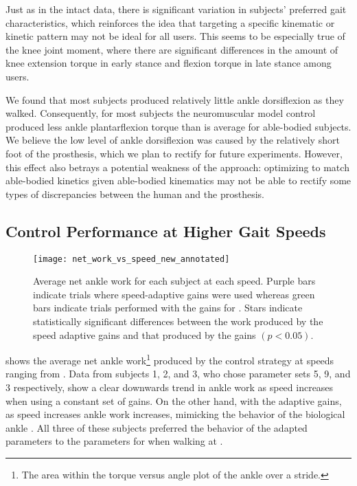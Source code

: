 Just as in the intact data, there is significant variation in subjects'
preferred gait characteristics, which reinforces the idea that targeting a
specific kinematic or kinetic pattern may not be ideal for all users. This seems
to be especially true of the knee joint moment, where there are significant
differences in the amount of knee extension torque in early stance and flexion
torque in late stance among users. 

We found that most subjects produced relatively little ankle dorsiflexion as
they walked. Consequently, for most subjects the neuromuscular model control
produced less ankle plantarflexion torque than is average for able-bodied
subjects.  We believe the low level of ankle dorsiflexion was caused by the
relatively short foot of the prosthesis, which we plan to rectify for future
experiments. However, this effect also betrays a potential weakness of the
approach: optimizing to match able-bodied kinetics given able-bodied kinematics
may not be able to rectify some types of discrepancies between the human and
the prosthesis.

\subsection{Control Performance at Higher Gait Speeds}
\begin{figure}
    \centering
    \texttt{[image: net\_work\_vs\_speed\_new\_annotated]}
    \caption{Average net ankle work for each subject at each speed. Purple bars
    indicate trials where speed-adaptive gains were used whereas green bars
    indicate trials performed with the gains for . Stars
    indicate statistically significant differences between the work produced by
    the speed adaptive gains and that produced by the  gains
    $(p < 0.05)$.}\label{fig:net_work_vs_speed}
\end{figure}

 shows the average net ankle work\footnote{The area
within the torque versus angle plot of the ankle over a stride.} produced by the
control strategy at speeds ranging from . Data from
subjects 1, 2, and 3, who chose parameter sets 5, 9, and 3 respectively, show a
clear downwards trend in ankle work as speed increases when using a constant set
of gains. On the other hand, with the adaptive gains, as speed increases ankle
work increases, mimicking the behavior of the biological ankle
\citep{herr2012bionic}. All three of these subjects preferred the behavior of
the adapted parameters to the parameters for  when walking
at .

